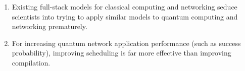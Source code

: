 \begin{enumerate}[widest=10]








  \item Existing full-stack models for classical computing and networking seduce scientists into trying to apply similar models to quantum computing and networking prematurely.
  \item For increasing quantum network application performance (such as success probability), improving scheduling is far more effective than improving compilation.
  

\end{enumerate}
